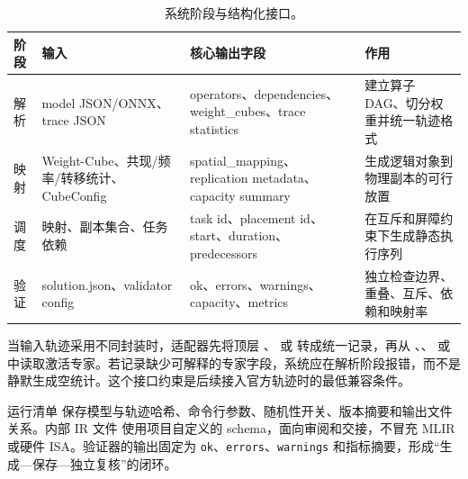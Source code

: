 \begin{table}[t]
\centering
\caption{系统阶段与结构化接口。}
\label{tab:interfaces}
\begin{tabularx}{\textwidth}{l l X X}
\toprule
阶段 & 输入 & 核心输出字段 & 作用 \\
\midrule
解析 & model JSON/ONNX、trace JSON & operators、dependencies、weight\_cubes、trace statistics & 建立算子 DAG、切分权重并统一轨迹格式 \\
映射 & Weight-Cube、共现/频率/转移统计、CubeConfig & spatial\_mapping、replication metadata、capacity summary & 生成逻辑对象到物理副本的可行放置 \\
调度 & 映射、副本集合、任务依赖 & task id、placement id、start、duration、predecessors & 在互斥和屏障约束下生成静态执行序列 \\
验证 & solution.json、validator config & ok、errors、warnings、capacity、metrics & 独立检查边界、重叠、互斥、依赖和映射率 \\
\bottomrule
\end{tabularx}
\end{table}

当输入轨迹采用不同封装时，适配器先将顶层 、 或  转成统一记录，再从 、、 或  中读取激活专家。若记录缺少可解释的专家字段，系统应在解析阶段报错，而不是静默生成空统计。这个接口约束是后续接入官方轨迹时的最低兼容条件。

运行清单  保存模型与轨迹哈希、命令行参数、随机性开关、版本摘要和输出文件关系。内部 IR 文件  使用项目自定义的  schema，面向审阅和交接，不冒充 MLIR 或硬件 ISA。验证器的输出固定为 \texttt{ok}、\texttt{errors}、\texttt{warnings} 和指标摘要，形成“生成—保存—独立复核”的闭环。
